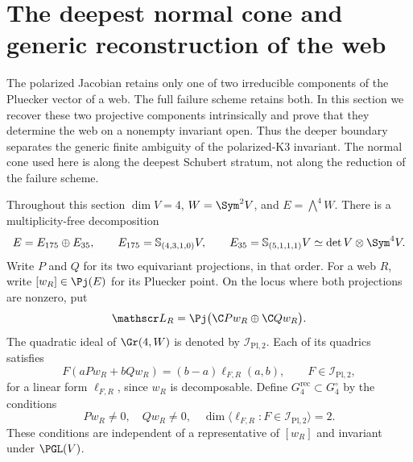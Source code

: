 \section{The deepest normal cone and generic reconstruction of the web}
\label{sec:intrinsic-web-reconstruction}

The polarized Jacobian retains only one of two irreducible components
of the Pluecker vector of a web.  The full failure scheme retains
both.  In this section we recover these two projective components
intrinsically and prove that they determine the web on a nonempty
invariant open.  Thus the deeper boundary separates the generic
finite ambiguity of the polarized-K3 invariant.  The normal cone
used here is along the deepest Schubert stratum, not along the
reduction of the failure scheme.

Throughout this section \(\dim V=4\), \(W=\Sym^2V\), and
\(E=\bigwedge^4W\).  There is a multiplicity-free decomposition
\begin{equation}\label{eq:two-web-components}
 E=E_{175}\oplus E_{35},\qquad
 E_{175}=\mathbb S_{(4,3,1,0)}V,\qquad
 E_{35}=\mathbb S_{(5,1,1,1)}V
       \simeq\det V\otimes\Sym^4V.
\end{equation}
Write \(P\) and \(Q\) for its two equivariant projections, in
that order.  For a web \(R\), write \([w_R]\in\Pj(E)\) for
its Pluecker point.  On the locus where both projections are nonzero,
put
\[
 \mathscr L_R=\Pj\bigl(\C Pw_R\oplus\C Qw_R\bigr).
\]
The quadratic ideal of \(\Gr(4,W)\) is denoted by
\(\mathcal I_{\mathrm{Pl},2}\).  Each of its quadrics satisfies
\begin{equation}\label{eq:plucker-linear-quotient}
 F(aPw_R+bQw_R)=(b-a)\ell_{F,R}(a,b),
 \qquad F\in\mathcal I_{\mathrm{Pl},2},
\end{equation}
for a linear form \(\ell_{F,R}\), since \(w_R\) is decomposable.
Define \(G_4^{\mathrm{rec}}\subset G_4^\circ\) by the conditions
\begin{equation}\label{eq:reconstruction-open}
 Pw_R\ne0,\quad Qw_R\ne0,\quad
 \dim\langle\ell_{F,R}:F\in\mathcal I_{\mathrm{Pl},2}\rangle=2.
\end{equation}
These conditions are independent of a representative of \([w_R]\)
and invariant under \(\PGL(V)\).

